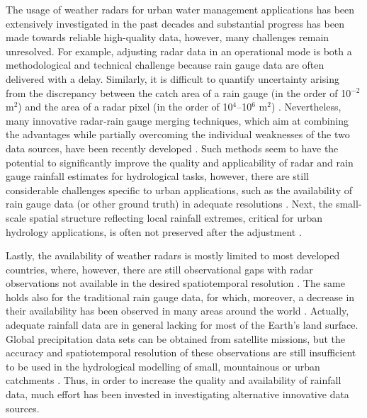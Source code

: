 \documentclass{ctuthesis}\usepackage[]{graphicx}\usepackage[]{color}
\begin{document}
The usage of weather radars for urban water management applications has been extensively investigated in the past decades and substantial progress has been made towards reliable high-quality data, however, many challenges remain unresolved. For example, adjusting radar data in an operational mode is both a methodological and technical challenge because rain gauge data are often delivered with a delay. Similarly, it is difficult to quantify uncertainty arising from the discrepancy between the catch area of a rain gauge (in the order of 10$^{-2}$ m$^2$) and the area of a radar pixel (in the order of 10$^4$--10$^6$ m$^2$) \citep[e.g.][]{anagnostouUncertaintyQuantificationMeanAreal1999}. Nevertheless, many innovative radar‐rain gauge merging techniques, which aim at combining the advantages while partially overcoming the individual weaknesses of the two data sources, have been recently developed \citep{mckeeReviewGaugeRadar2016}. Such methods seem to have the potential to significantly improve the quality and applicability of radar and rain gauge rainfall estimates for hydrological tasks, however, there are still considerable challenges specific to urban applications, such as the availability of rain gauge data (or other ground truth) in adequate resolutions \citep{ochoa-rodriguezReviewRadarRain2019}. Next, the small-scale spatial structure reflecting local rainfall extremes, critical for urban hydrology applications, is often not preserved after the adjustment \citep{wangRadarRaingaugeData2013, borupDynamicGaugeAdjustment2016, ochoa-rodriguezReviewRadarRain2019}. 

Lastly, the availability of weather radars is mostly limited to most developed countries, where, however, there are still observational gaps with radar observations not available in the desired spatiotemporal resolution \citep{heistermannTechnicalNoteOpen2013, saltikoffOverviewUsingWeather2019}. The same holds also for the traditional rain gauge data, for which, moreover, a decrease in their availability has been observed in many areas around the world \citep{lorenzHydrologicalCycleThree2012, sunReviewGlobalPrecipitation2018}. Actually,  adequate rainfall data are in general lacking for most of the Earth’s land surface. Global precipitation data sets can be obtained from satellite missions, but the accuracy and spatiotemporal resolution of these observations are still insufficient to be used in the hydrological modelling of small, mountainous or urban catchments \citep{kiddGlobalPrecipitationMeasurement2011}. Thus, in order to increase the quality and availability of rainfall data, much effort has been invested in investigating alternative innovative data sources.
\end{document}

